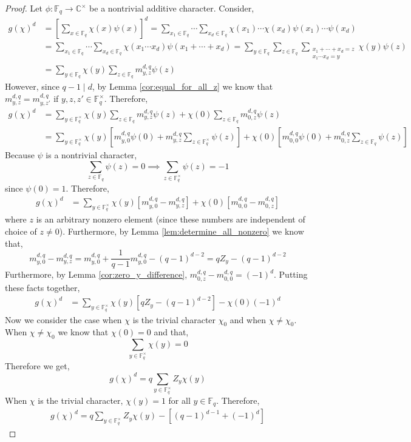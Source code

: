 \documentclass{article}
\newcommand{\C}{\mathbb{C}}
\newcommand{\finfield}[1]{\mathbb{F}_{#1}}
\newcommand{\finunits}[1]{\mathbb{F}_{#1}^\times}
\newcommand{\divides}{\mid}
\theoremstyle{definition}
\theoremstyle{definition}
\theoremstyle{remark}
\begin{document}
\begin{proof}
Let $\phi : \finfield{q} \to \C^\times$ be a nontrivial additive character. Consider,
\begin{align*}
g(\chi)^d & = \left[ \sum_{x \in \finfield{q}} \chi(x) \psi(x) \right]^d = \sum_{x_1 \in \finfield{q}} \cdots \sum_{x_d \in \finfield{q}} \chi(x_1) \cdots \chi(x_d) \psi(x_1) \cdots \psi(x_d) 
\\
& = \sum_{x_1 \in \finfield{q}} \cdots \sum_{x_d \in \finfield{q}} \chi(x_1 \cdots x_d) \psi(x_1 + \cdots + x_d) = \sum_{y \in \finfield{q}} \sum_{z \in \finfield{q}} \sum_{\substack{x_1 + \cdots + x_d = z \\ x_1 \cdots x_d = y}} \chi(y) \psi(z) 
\\
& = \sum_{y \in \finfield{q}} \chi(y) \sum_{z \in \finfield{q}} m^{d,q}_{y, z} \psi(z) 
\end{align*}
However, since $q - 1 \divides d$, by Lemma \ref{cor:equal_for_all_z} we know that $m^{d,q}_{y,z} = m^{d,q}_{y,z'}$ if $y, z, z' \in \finunits{q}$. Therefore,
\begin{align*}
g(\chi)^d & = \sum_{y \in \finunits{q}} \chi(y) \sum_{z \in \finfield{q}} m^{d,q}_{y, z} \psi(z) + \chi(0) \sum_{z \in \finfield{q}} m^{d,q}_{0, z} \psi(z)
\\
& = \sum_{y \in \finunits{q}} \chi(y) \left[ m^{d,q}_{y,0} \psi(0) + m^{d,q}_{y,z} \sum_{z \in \finunits{q}} \psi(z) \right] + \chi(0) \left[ m^{d,q}_{0, 0} \psi(0) + m^{d,q}_{0,z} \sum_{z \in \finfield{q}} \psi(z) \right]
\end{align*}
Because $\psi$ is a nontrivial character,
\[ \sum_{z \in \finfield{q}} \psi(z) = 0 \implies \sum_{z \in \finunits{q}} \psi(z) = - 1 \]
since $\psi(0) = 1$. Therefore, 
\begin{align*}
g(\chi)^d & = \sum_{y \in \finunits{q}} \chi(y) \left[ m^{d,q}_{y,0} - m^{d,q}_{y,z} \right] + \chi(0) \left[ m^{d,q}_{0, 0} - m^{d,q}_{0,z} \right]
\end{align*}
where $z$ is an arbitrary nonzero element (since these numbers are independent of choice of $z \neq 0$). Furthermore, by Lemma \ref{lem:determine_all_nonzero} we know that,
\[ m^{d,q}_{y,0} - m^{d,q}_{y,z} = m^{d,q}_{y,0} + \frac{1}{q-1} m^{d,q}_{y,0} - (q-1)^{d-2} = q Z_y - (q-1)^{d-2} \]
Furthermore, by Lemma \ref{cor:zero_y_difference}, $m^{d,q}_{0,z} - m^{d,q}_{0,0} = (-1)^d$. Putting these facts together,
\begin{align*}
g(\chi)^d & = \sum_{y \in \finunits{q}} \chi(y) \left[ q Z_y - (q-1)^{d-2} \right] - \chi(0) (-1)^d
\end{align*}
Now we consider the case when $\chi$ is the trivial character $\chi_0$ and when $\chi \neq \chi_0$. When $\chi \neq \chi_0$ we know that $\chi(0) = 0$ and that,
\[ \sum_{y \in \finunits{q}} \chi(y) = 0 \]
Therefore we get,
\[ g(\chi)^d = q \sum_{y \in \finunits{q}} Z_y \chi(y) \]
When $\chi$ is the trivial character, $\chi(y) = 1$ for all $y \in \finfield{q}$. Therefore,
\begin{align*}
g(\chi)^d = q \sum_{y \in \finunits{q}} Z_y \chi(y) - \left[ (q-1)^{d-1} + (-1)^d \right]  
\end{align*}
\end{proof}
\end{document}
